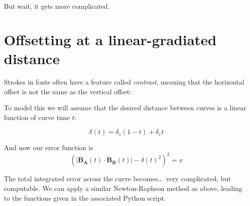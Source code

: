 \documentclass[a4paper]{article}
\newcommand{\norm}[1]{\lvert #1 \rvert}
\begin{document}
But wait, it gets more complicated.

\section{Offsetting at a linear-gradiated distance}

Strokes in fonts often have a feature called \textit{contrast}, meaning that the horizontal offset is not the same as the vertical offset:

\bigskip
{}
\bigskip

To model this we will assume that the desired distance between curves is a linear function of curve time $t$:

\begin{equation}
\delta(t) = \delta_s(1-t) + \delta_e t
\end{equation}

And now our error function is 
\begin{equation}
(\norm{\mathbf{B_A}(t)\cdot\mathbf{B_B}(t)} - \delta(t)^2)^2 = x
\end{equation}

The total integrated error across the curve becomes\dots\ very complicated, but computable. We can apply a similar Newton-Raphson method as above, leading to the functions given in the associated Python script.
\end{document}
